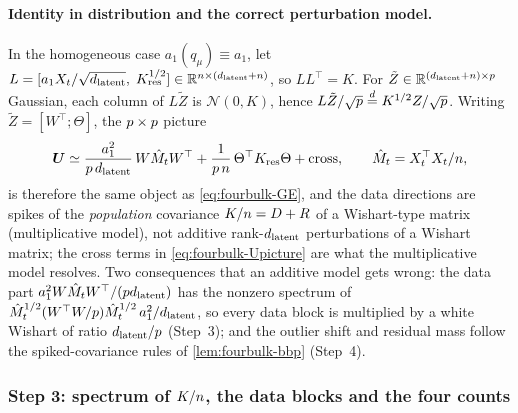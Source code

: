 \paragraph{Identity in distribution and the correct perturbation model.}
In the homogeneous case $a_1(q_\mu)\equiv a_1$, let $L=[a_1X_t/\sqrt{d_{\mathrm{latent}}},\;K_{\mathrm{res}}^{1/2}]\in\mathbb{R}^{n\times(d_{\mathrm{latent}}+n)}$, so $LL^\top=K$. For $\tilde Z\in\mathbb{R}^{(d_{\mathrm{latent}}+n)\times p}$ Gaussian, each column of $L\tilde Z$ is $\mathcal N(0,K)$, hence $L\tilde Z/\sqrt{p}\overset d=K^{1/2}Z/\sqrt{p}$. Writing $\tilde Z=[W^\top;\Theta]$, the $p\times p$ picture
\begin{equation}\label{eq:fourbulk-Upicture}
  \bm{U}\simeq\frac{a_1^2}{p\,d_{\mathrm{latent}}}\,W\hat M_tW^\top+\frac{1}{p\,n}\,\Theta^\top K_{\mathrm{res}}\Theta+\text{cross},\qquad \hat M_t=X_t^\top X_t/n,
\end{equation}
is therefore the same object as \eqref{eq:fourbulk-GE}, and the data directions are spikes of the \emph{population} covariance $K/n=D+R$ of a Wishart-type matrix (multiplicative model), not additive rank-$d_{\mathrm{latent}}$ perturbations of a Wishart matrix; the cross terms in \eqref{eq:fourbulk-Upicture} are what the multiplicative model resolves. Two consequences that an additive model gets wrong: the data part $a_1^2W\hat M_tW^\top/(pd_{\mathrm{latent}})$ has the nonzero spectrum of $\hat M_t^{1/2}(W^\top W/p)\hat M_t^{1/2}\,a_1^2/d_{\mathrm{latent}}$, so every data block is multiplied by a white Wishart of ratio $d_{\mathrm{latent}}/p$ (Step~3); and the outlier shift and residual mass follow the spiked-covariance rules of \cref{lem:fourbulk-bbp} (Step~4).

\subsubsection{Step 3: spectrum of $K/n$, the data blocks and the four counts}

